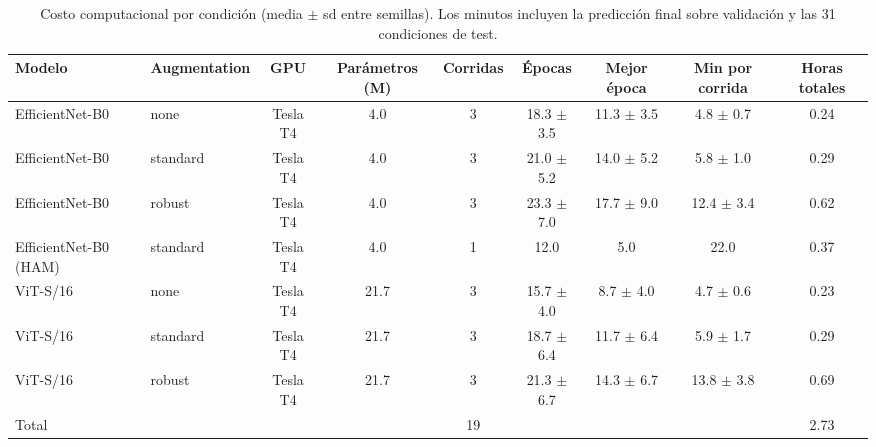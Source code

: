\begin{table}[t]
\caption{Costo computacional por condición (media $\pm$ sd entre semillas). Los minutos incluyen la predicción final sobre validación y las 31 condiciones de test.}
\label{tab:cost}
\centering
\begin{adjustbox}{max width=\linewidth}
\begin{tabular}{llccccccc}
\toprule
Modelo & Augmentation & GPU & Parámetros (M) & Corridas & Épocas & Mejor época & Min por corrida & Horas totales \\
\midrule
EfficientNet-B0 & none & Tesla T4 & 4.0 & 3 & 18.3 $\pm$ 3.5 & 11.3 $\pm$ 3.5 & 4.8 $\pm$ 0.7 & 0.24 \\
EfficientNet-B0 & standard & Tesla T4 & 4.0 & 3 & 21.0 $\pm$ 5.2 & 14.0 $\pm$ 5.2 & 5.8 $\pm$ 1.0 & 0.29 \\
EfficientNet-B0 & robust & Tesla T4 & 4.0 & 3 & 23.3 $\pm$ 7.0 & 17.7 $\pm$ 9.0 & 12.4 $\pm$ 3.4 & 0.62 \\
EfficientNet-B0 (HAM) & standard & Tesla T4 & 4.0 & 1 & 12.0 & 5.0 & 22.0 & 0.37 \\
ViT-S/16 & none & Tesla T4 & 21.7 & 3 & 15.7 $\pm$ 4.0 & 8.7 $\pm$ 4.0 & 4.7 $\pm$ 0.6 & 0.23 \\
ViT-S/16 & standard & Tesla T4 & 21.7 & 3 & 18.7 $\pm$ 6.4 & 11.7 $\pm$ 6.4 & 5.9 $\pm$ 1.7 & 0.29 \\
ViT-S/16 & robust & Tesla T4 & 21.7 & 3 & 21.3 $\pm$ 6.7 & 14.3 $\pm$ 6.7 & 13.8 $\pm$ 3.8 & 0.69 \\
Total &  &  &  & 19 &  &  &  & 2.73 \\
\bottomrule
\end{tabular}
\end{adjustbox}
\end{table}

